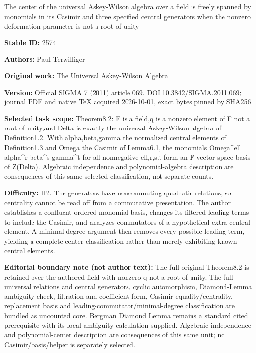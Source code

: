 \documentclass[11pt]{article}
\numberwithin{equation}{section}
\begin{document}
\begin{center}\Large The center of the universal Askey-Wilson algebra over a field is freely spanned by monomials in its Casimir and three specified central generators when the nonzero deformation parameter is not a root of unity\end{center}
\noindent\textbf{Stable ID:} 2574\par
\noindent\textbf{Authors:} Paul Terwilliger\par
\noindent\textbf{Original work:} The Universal Askey-Wilson Algebra\par
\noindent\textbf{Version:} Official SIGMA 7 (2011) article 069, DOI 10.3842/SIGMA.2011.069; journal PDF and native TeX acquired 2026-10-01, exact bytes pinned by SHA256\par
\noindent\textbf{Selected task scope:} Theorem8.2: F is a field,q is a nonzero element of F not a root of unity,and Delta is exactly the universal Askey-Wilson algebra of Definition1.2. With alpha,beta,gamma the normalized central elements of Definition1.3 and Omega the Casimir of Lemma6.1, the monomials Omega\textasciicircum{}ell alpha\textasciicircum{}r beta\textasciicircum{}s gamma\textasciicircum{}t for all nonnegative ell,r,s,t form an F-vector-space basis of Z(Delta). Algebraic independence and polynomial-algebra description are consequences of this same selected classification, not separate counts.\par
\noindent\textbf{Difficulty:} H2: The generators have noncommuting quadratic relations, so centrality cannot be read off from a commutative presentation. The author establishes a confluent ordered monomial basis, changes its filtered leading terms to include the Casimir, and analyzes commutators of a hypothetical extra central element. A minimal-degree argument then removes every possible leading term, yielding a complete center classification rather than merely exhibiting known central elements.\par
\noindent\textbf{Editorial boundary note (not author text):} The full original Theorem8.2 is retained over the authored field with nonzero q not a root of unity. The full universal relations and central generators, cyclic automorphism, Diamond-Lemma ambiguity check, filtration and coefficient form, Casimir equality/centrality, replacement basis and leading-commutator/minimal-degree classification are bundled as uncounted core. Bergman Diamond Lemma remains a standard cited prerequisite with its local ambiguity calculation supplied. Algebraic independence and polynomial-center description are consequences of this same unit; no Casimir/basis/helper is separately selected.\par
\end{document}
